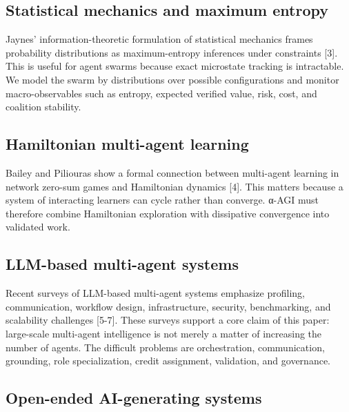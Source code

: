 \subsection{Statistical mechanics and maximum
entropy}\label{statistical-mechanics-and-maximum-entropy}

Jaynes' information-theoretic formulation of statistical mechanics
frames probability distributions as maximum-entropy inferences under
constraints {[}3{]}. This is useful for agent swarms because exact
microstate tracking is intractable. We model the swarm by distributions
over possible configurations and monitor macro-observables such as
entropy, expected verified value, risk, cost, and coalition stability.

\subsection{Hamiltonian multi-agent
learning}\label{hamiltonian-multi-agent-learning}

Bailey and Piliouras show a formal connection between multi-agent
learning in network zero-sum games and Hamiltonian dynamics {[}4{]}.
This matters because a system of interacting learners can cycle rather
than converge. α-AGI must therefore combine Hamiltonian exploration with
dissipative convergence into validated work.

\subsection{LLM-based multi-agent
systems}\label{llm-based-multi-agent-systems}

Recent surveys of LLM-based multi-agent systems emphasize profiling,
communication, workflow design, infrastructure, security, benchmarking,
and scalability challenges {[}5-7{]}. These surveys support a core claim
of this paper: large-scale multi-agent intelligence is not merely a
matter of increasing the number of agents. The difficult problems are
orchestration, communication, grounding, role specialization, credit
assignment, validation, and governance.

\subsection{Open-ended AI-generating
systems}\label{open-ended-ai-generating-systems}

